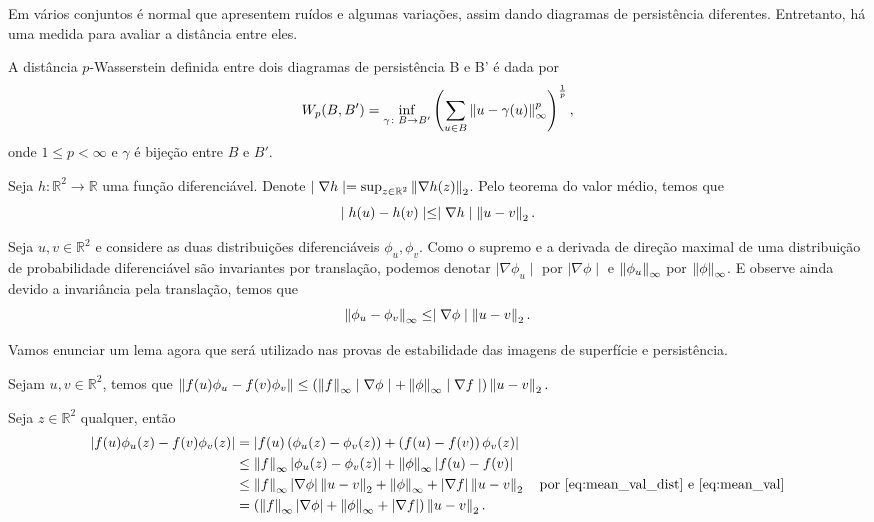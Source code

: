 Em vários conjuntos é normal que apresentem ruídos e algumas variações, assim dando diagramas de persistência
diferentes. Entretanto, há uma medida para avaliar a distância entre eles. 
\begin{defi}
    A distância $p$-Wasserstein definida entre dois diagramas de persistência B e B' é dada por 
    \begin{equation*}
        W_p(B,B') = \inf_{\gamma\colon B \to B'} \left( \sum_{u\in B} \left\lVert u - \gamma(u)\right\rVert_{\infty}^{p} 
                    \right)^\frac{1}{p},
    \end{equation*}
    onde $1 \leq p < \infty$ e $\gamma$ é bijeção entre $B$ e $B'$. 
\end{defi}

Seja $h\colon \mathbb{R}^2 \to \mathbb{R}$ uma função diferenciável. Denote 
$\mid \nabla h \mid = \sup_{z\in \mathbb{R}^2} \left\lVert\nabla h(z)\right\rVert_2$. Pelo teorema do valor médio, temos que 
\begin{equation}\label{eq:mean_val}
    \mid h(u) - h(v) \mid \leq \mid \nabla h \mid \left\lVert u-v\right\rVert_2.
\end{equation}

Seja $u,v\in \mathbb{R}^2$ e considere as duas distribuições diferenciáveis $\phi_u, \phi_v$. Como o supremo e 
a derivada de direção maximal de uma distribuição de probabilidade diferenciável são invariantes por translação,
podemos denotar $\mid \nabla \phi_u \mid$ por $\mid \nabla \phi \mid$ e $\left\lVert\phi_u\right\rVert_\infty$ por
$\left\lVert\phi\right\rVert_\infty$. E observe ainda devido a invariância pela translação, temos que 
\begin{equation}\label{eq:mean_val_dist}
    \left\lVert\phi_u - \phi_v\right\rVert_\infty \leq \mid \nabla \phi \mid \left\lVert u-v\right\rVert_2.
\end{equation} 

Vamos enunciar um lema agora que será utilizado nas provas de estabilidade das imagens de superfície e persistência.

\begin{lem}\label{lema:persimg}
    Sejam $u,v\in \mathbb{R}^2$, temos que $\left\lVert f(u)\phi_u - f(v)\phi_v\right\rVert \leq 
    \left( \left\lVert f\right\rVert_\infty \mid \nabla \phi \mid + \left\lVert\phi\right\rVert_\infty \mid \nabla f \mid \right) \left\lVert u-v\right\rVert_2.$
\end{lem}
\begin{demonstracao}
Seja $z\in \mathbb{R}^2$ qualquer, então
\begin{align*}
  \begin{split}
    \left\lvert f(u)\phi_u(z) - f(v)\phi_v(z)\right\rvert &= \left\lvert f(u) \left(\phi_u(z) - \phi_v(z)\right) + \left( f(u) - f(v)\right)
    \phi_v(z)\right\rvert \\
    &\leq \left\lVert f\right\rVert_\infty \left\lvert\phi_u(z) - \phi_v(z)\right\rvert + \left\lVert\phi\right\rVert_\infty \left\lvert f(u) - f(v)\right\rvert\\
    &\leq \left\lVert f\right\rVert_\infty \left\lvert\nabla \phi\right\rvert \left\lVert u-v\right\rVert_2 + \left\lVert\phi\right\rVert_\infty + \left\lvert\nabla f\right\rvert \left\lVert u-v\right\rVert_2 
     \quad \text{por \ref{eq:mean_val_dist} e \ref{eq:mean_val}}\\
    &= \left( \left\lVert f\right\rVert_\infty \left\lvert\nabla \phi\right\rvert + \left\lVert\phi\right\rVert_\infty + \left\lvert\nabla f\right\rvert\right) \left\lVert u-v\right\rVert_2.
  \end{split}
\end{align*}
\end{demonstracao}

